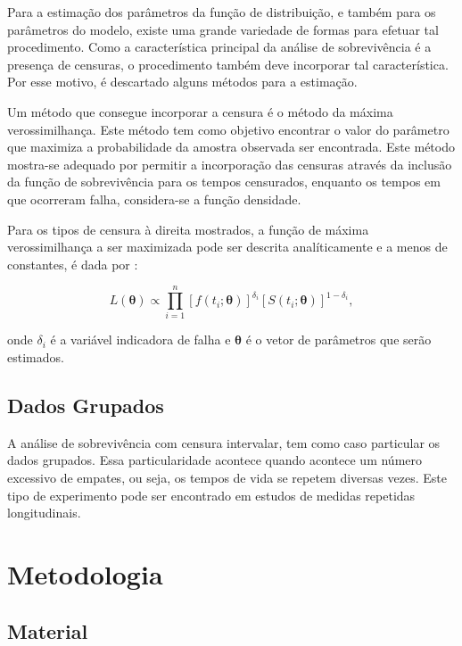 \documentclass[a4paper,12pt]{article}
\begin{document}
Para a estimação dos parâmetros da função de distribuição, e também para os parâmetros do modelo, existe uma grande variedade de formas para efetuar tal procedimento. Como a característica principal da análise de sobrevivência é a presença de censuras, o procedimento também deve incorporar tal característica. Por esse motivo, é descartado alguns métodos para a estimação.

Um método que consegue incorporar a censura é o método da máxima verossimilhança. Este método tem como objetivo encontrar o valor do parâmetro que maximiza a probabilidade da amostra observada ser encontrada. Este método mostra-se adequado por permitir a incorporação das censuras através da inclusão da função de sobrevivência para os tempos censurados, enquanto os tempos em que ocorreram falha, considera-se a função densidade.

Para os tipos de censura à direita mostrados, a função de máxima verossimilhança a ser maximizada pode ser descrita analíticamente e a menos de constantes, é dada por \cite{colosimo:2006}:

\begin{equation} \label{eq:maxv1}
  L(\boldsymbol{\theta}) \propto \prod_{i=1}^n \left[f(t_i;\boldsymbol{\theta})\right]^{\delta_i} \left[S(t_i;\boldsymbol{\theta})\right]^{1-\delta_i}, 
\end{equation}

onde $\delta_i$ é a variável indicadora de falha e $\boldsymbol{\theta}$ é o vetor de parâmetros que serão estimados.

\subsection{Dados Grupados}

A análise de sobrevivência com censura intervalar, tem como caso particular os dados grupados. Essa particularidade acontece quando acontece um número excessivo de empates, ou seja, os tempos de vida se repetem diversas vezes. Este tipo de experimento pode ser encontrado em estudos de medidas repetidas longitudinais.




\newpage
\section{Metodologia}
\noindent

\subsection{Material}
\end{document}
